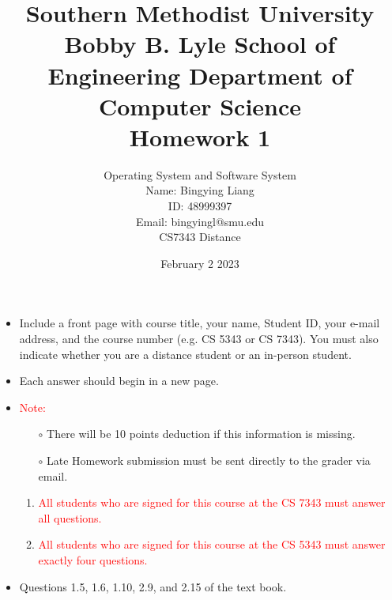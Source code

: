 \documentclass[12pt]{article}
\title{Southern Methodist University \\
Bobby B. Lyle School of Engineering Department of Computer Science \\
Homework 1
}
\author{Operating System and Software System \\
Name: Bingying Liang 
\\ ID: 48999397\\ 
Email: bingyingl@smu.edu \\ 
CS7343 Distance}
\date{February 2 2023}
\begin{document}
\maketitle
\begin{itemize}
    \item Include a front page with course title, your name, Student ID, your e-mail address, and the course number (e.g. CS 5343 or CS 7343). You must also indicate whether you are a distance student or an in-person student.

    \item Each answer should begin in a new page.
    \item \textcolor{red}{Note:}
    \begin{itemize}
        \item[$\circ$] There will be 10 points deduction if this information is missing.
        \item[$\circ$] Late Homework submission must be sent directly to the grader via email.
    \end{itemize}
\begin{enumerate}
    \item \textcolor{red}{All students who are signed for this course at the CS 7343 must answer all questions.}
    \item  \textcolor{red}{All students who are signed for this course at the CS 5343 must answer exactly four questions.}
\end{enumerate}
\item Questions 1.5, 1.6, 1.10, 2.9, and 2.15 of the text book.
\end{itemize}
\newpage
\end{document}

